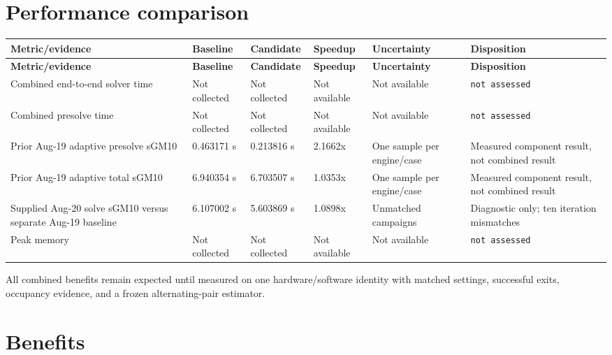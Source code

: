 \documentclass[10pt,a4paper]{article}
\begin{document}
\section{Performance comparison}

\small
\begin{longtable}{@{}P{0.19\textwidth}P{0.12\textwidth}P{0.12\textwidth}P{0.11\textwidth}P{0.12\textwidth}P{0.17\textwidth}@{}}
\toprule
\textbf{Metric/evidence} & \textbf{Baseline} & \textbf{Candidate} & \textbf{Speedup} & \textbf{Uncertainty} & \textbf{Disposition}\\
\midrule
\endfirsthead
\toprule
\textbf{Metric/evidence} & \textbf{Baseline} & \textbf{Candidate} & \textbf{Speedup} & \textbf{Uncertainty} & \textbf{Disposition}\\
\midrule
\endhead
Combined end-to-end solver time & Not collected & Not collected & Not available & Not available & \texttt{not assessed}\\
Combined presolve time & Not collected & Not collected & Not available & Not available & \texttt{not assessed}\\
Prior Aug-19 adaptive presolve sGM10 & 0.463171 s & 0.213816 s & 2.1662x & One sample per engine/case & Measured component result, not combined result\\
Prior Aug-19 adaptive total sGM10 & 6.940354 s & 6.703507 s & 1.0353x & One sample per engine/case & Measured component result, not combined result\\
Supplied Aug-20 solve sGM10 versus separate Aug-19 baseline & 6.107002 s & 5.603869 s & 1.0898x & Unmatched campaigns & Diagnostic only; ten iteration mismatches\\
Peak memory & Not collected & Not collected & Not available & Not available & \texttt{not assessed}\\
\bottomrule
\end{longtable}
\normalsize

All combined benefits remain expected until measured on one hardware/software
identity with matched settings, successful exits, occupancy evidence, and a
frozen alternating-pair estimator.

\section{Benefits}
\end{document}
